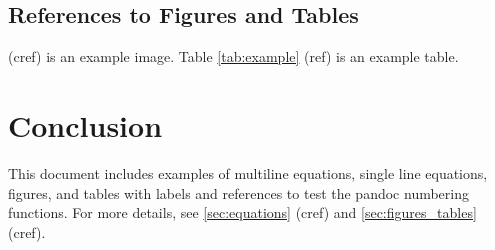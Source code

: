 \documentclass{article}
\begin{document}
\subsection{References to Figures and Tables}
 (cref) is an example image. Table \ref{tab:example} (ref) is an example table. 

\section{Conclusion}
This document includes examples of multiline equations, single line equations, figures, and tables with labels and references to test the pandoc numbering functions. For more details, see \cref{sec:equations} (cref) and \cref{sec:figures_tables} (cref).
\end{document}
